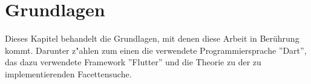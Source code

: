 \chapter{Grundlagen}
\label{ch:Grundlagen}

Dieses Kapitel behandelt die Grundlagen, mit denen diese Arbeit in Berührung kommt.
Darunter z{"a}hlen zum einen die verwendete Programmiersprache ''Dart'', das dazu verwendete Framework ''Flutter'' und die Theorie zu der zu implementierenden Facettensuche.



